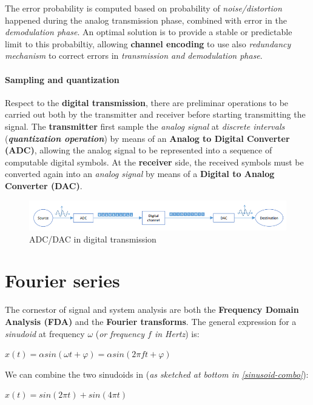 \documentclass[10pt,a4paper]{report}
\theoremstyle{definition}
\begin{document}
The error probability is computed based on probability of \textit{noise/distortion} happened during the analog transmission phase, combined with error in the \textit{demodulation phase}. An optimal solution is to provide a stable or predictable limit to this probabiltiy, allowing \textbf{channel encoding} to use also \textit{redundancy mechanism} to correct errors in \textit{transmission and demodulation phase}.
\paragraph{Sampling and quantization}\label{sec:sampling-and-quantization}
Respect to the \textbf{digital transmission}, there are preliminar operations to be carried out both by the transmitter and receiver before starting transmitting the signal.
The \textbf{transmitter} first sample the \textit{analog signal} at \textit{discrete intervals} (\textit{\textbf{quantization operation}}) by means of an \textbf{Analog to Digital Converter (ADC)}, allowing the analog signal to be represented into a sequence of computable digital symbols.
At the \textbf{receiver} side, the received symbols must be converted again into an \textit{analog signal} by means of a \textbf{Digital to Analog Converter (DAC)}.
\begin{figure}[h]
	\centering\includegraphics[scale=0.50]{images/Pasted image 20230505121537.png}
	\caption{ADC/DAC in digital transmission}
\end{figure}

\section{Fourier series}\label{sec:fourier-series}
The cornestor of signal and system analysis are both the \textbf{Frequency Domain Analysis (FDA)} and the \textbf{Fourier transforms}.
The general expression for a \textit{sinudoid} at frequency $\omega$ (\textit{or frequency $f$ in Hertz}) is:
\begin{center}
$x(t)=\alpha sin(\omega t + \varphi) = \alpha sin(2\pi ft + \varphi)$
\end{center}

We can combine the two sinudoids in (\textit{as sketched at bottom in \ref{sinusoid-combo}}):
\begin{center}
$x(t) = sin(2\pi t) + sin(4\pi t)$
\end{center}
\end{document}
